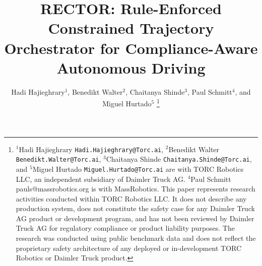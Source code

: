 \documentclass[lettersize,journal, twocolumn]{IEEEtran}
\begin{document}
\title{\textsc{RECTOR}: Rule-Enforced Constrained Trajectory Orchestrator
for Compliance-Aware Autonomous Driving}

\author{Hadi Hajieghrary$^{1}$, Benedikt Walter$^{2}$, Chaitanya Shinde$^{3}$, Paul Schmitt$^{4}$, and Miguel Hurtado$^{5}$%
\thanks{$^{1}$Hadi Hajieghrary {\tt\small Hadi.Hajieghrary@Torc.ai}, $^{2}$Benedikt Walter {\tt\small Benedikt.Walter@Torc.ai}, $^{3}$Chaitanya Shinde {\tt\small Chaitanya.Shinde@Torc.ai}, and $^{5}$Miguel Hurtado {\tt\small Miguel.Hurtado@Torc.ai} are with TORC Robotics LLC, an independent subsidiary of Daimler Truck AG. $^{4}$Paul Schmitt {pauls@massrobotics.org} is with MassRobotics. This paper represents research activities conducted within TORC Robotics LLC. It does not describe any production system, does not constitute the safety case for any Daimler Truck AG product or development program, and has not been reviewed by Daimler Truck AG for regulatory compliance or product liability purposes. The research was conducted using public benchmark data and does not reflect the proprietary safety architecture of any deployed or in-development TORC Robotics or Daimler Truck product.}%
 }


\maketitle
\end{document}
